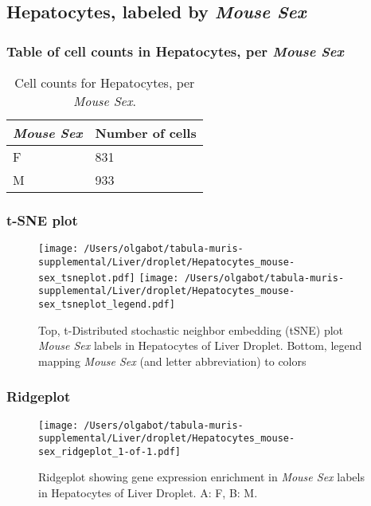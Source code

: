 \clearpage

\subsection{Hepatocytes, labeled by \emph{Mouse Sex}}
\subsubsection{Table of cell counts in Hepatocytes, per \emph{Mouse Sex}}\begin{table}[h]
\centering
\label{my-label}
\begin{tabular}{@{}ll@{}}
\toprule

\emph{Mouse Sex}& Number of cells \\ \midrule
F & 831 \\

M & 933 \\
\bottomrule
\end{tabular}
\caption{Cell counts for Hepatocytes, per \emph{Mouse Sex}.}
\end{table}

\clearpage
\subsubsection{t-SNE plot}
\begin{figure}[h]
\centering
\texttt{[image: /Users/olgabot/tabula-muris-supplemental/Liver/droplet/Hepatocytes\_mouse-sex\_tsneplot.pdf]}
\texttt{[image: /Users/olgabot/tabula-muris-supplemental/Liver/droplet/Hepatocytes\_mouse-sex\_tsneplot\_legend.pdf]}
\caption{Top, t-Distributed stochastic neighbor embedding (tSNE) plot  \emph{Mouse Sex} labels in Hepatocytes of Liver Droplet. Bottom, legend mapping \emph{Mouse Sex} (and letter abbreviation) to colors}
\end{figure}


\clearpage

\subsubsection{Ridgeplot}
\begin{figure}[h]
\centering
\texttt{[image: /Users/olgabot/tabula-muris-supplemental/Liver/droplet/Hepatocytes\_mouse-sex\_ridgeplot\_1-of-1.pdf]}

\caption{ Ridgeplot  showing gene expression enrichment in \emph{Mouse Sex} labels in Hepatocytes of Liver Droplet. A: F, B: M.}
\end{figure}


